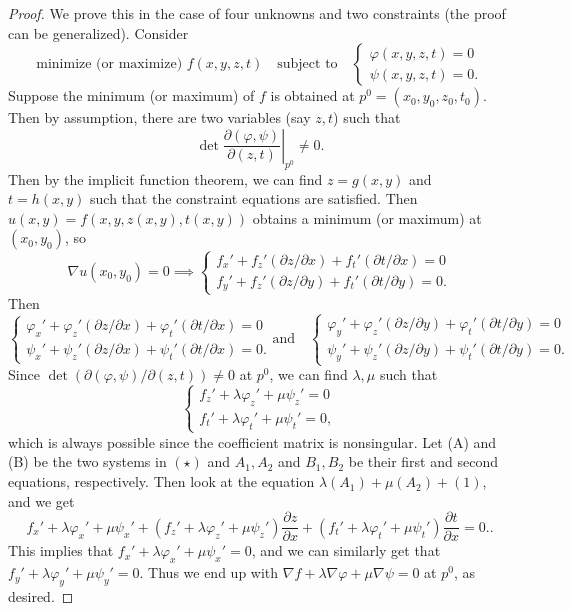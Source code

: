\begin{proof}
  We prove this in the case of four unknowns and
  two constraints (the proof can be generalized). Consider
  \[
    \text{minimize (or maximize) $f(x, y, z, t)$}
    \quad \text{subject to}
    \quad
    \begin{cases}
      \varphi(x, y, z, t) = 0 \\
      \psi(x, y, z, t) = 0.
    \end{cases}
  \]
  Suppose the minimum (or maximum) of $f$ is obtained
  at $p^0 = (x_0, y_0, z_0, t_0)$. Then by assumption,
  there are two variables (say $z, t$) such that
  \[
    \left.\det \frac{\partial (\varphi, \psi)}{\partial (z, t)}\right|_{p^0} \ne 0.
  \]
  Then by the implicit function theorem, we can find
  $z = g(x, y)$ and $t = h(x, y)$ such that the constraint
  equations are satisfied. Then
  $u(x, y) = f(x, y, z(x, y), t(x, y))$ obtains a minimum
  (or maximum) at $(x_0, y_0)$, so
  \[
    \nabla u(x_0, y_0) = 0
    \implies
    \begin{cases}
      f_x' + f_z' (\partial z / \partial x) + f_t' (\partial t / \partial x) = 0 \\
      f_y' + f_z' (\partial z / \partial y) + f_t' (\partial t / \partial y) = 0.
    \end{cases} \tag{1, 2}
  \]
  Then
  \[
    \begin{cases}
      \varphi_x' + \varphi_z' (\partial z / \partial x) + \varphi_t' (\partial t / \partial x) = 0 \\
      \psi_x' + \psi_z' (\partial z / \partial x) + \psi_t' (\partial t / \partial x) = 0.
    \end{cases}
    \text{and} \quad
    \begin{cases}
      \varphi_y' + \varphi_z' (\partial z / \partial y) + \varphi_t' (\partial t / \partial y) = 0 \\
      \psi_y' + \psi_z' (\partial z / \partial y) + \psi_t' (\partial t / \partial y) = 0.
    \end{cases} \tag{$\star$}
  \]
  Since $\det (\partial (\varphi, \psi) / \partial (z, t)) \ne 0$
  at $p^0$, we can find $\lambda, \mu$ such that
  \[
    \begin{cases}
      f_z' + \lambda \varphi_z' + \mu \psi_z' = 0 \\
      f_t' + \lambda \varphi_t' + \mu \psi_t' = 0,
    \end{cases}
  \]
  which is always possible since the coefficient
  matrix is nonsingular.
  Let (A) and (B) be the two systems in $(\star)$ and
  $A_1, A_2$ and $B_1, B_2$ be their first
  and second equations, respectively. Then look at
  the equation $\lambda(A_1) + \mu(A_2) + (1)$, and we get
  \[
  f_x' + \lambda \varphi_x' + \mu \psi_x' +
  (f_z' + \lambda \varphi_z' + \mu \psi_z') \frac{\partial z}{\partial x}
  + (f_t' + \lambda \varphi_t' + \mu \psi_t') \frac{\partial t}{\partial x} = 0.
  .\]
  This implies that $f_x' + \lambda \varphi_x' + \mu \psi_x' = 0$, and
  we can similarly get that
  $f_y' + \lambda \varphi_y' + \mu \psi_y' = 0$. Thus
  we end up with
  $\nabla f + \lambda \nabla \varphi + \mu \nabla \psi = 0$
  at $p^0$, as desired.
\end{proof}

